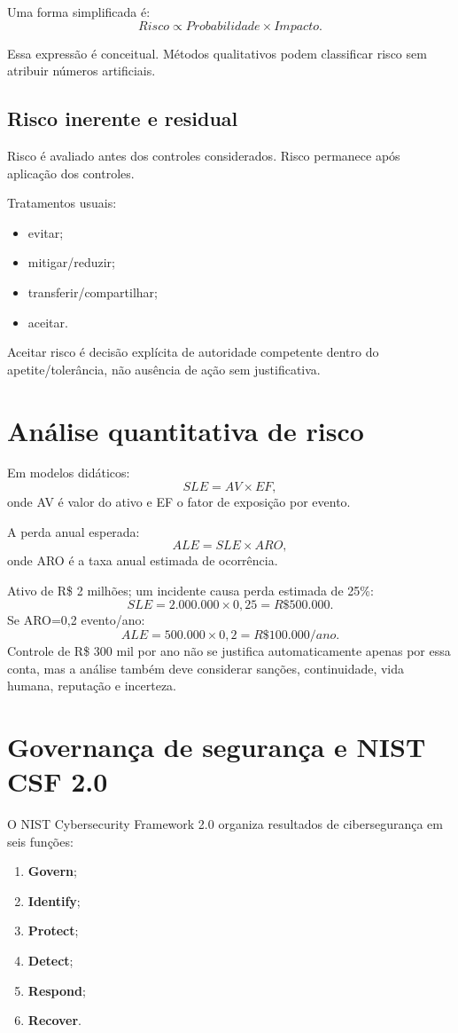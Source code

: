 Uma forma simplificada é:
\[
Risco \propto Probabilidade\times Impacto.
\]

Essa expressão é conceitual. Métodos qualitativos podem classificar risco sem atribuir números artificiais.

\subsection{Risco inerente e residual}

Risco  é avaliado antes dos controles considerados. Risco  permanece após aplicação dos controles.

Tratamentos usuais:
\begin{itemize}
\item evitar;
\item mitigar/reduzir;
\item transferir/compartilhar;
\item aceitar.
\end{itemize}

Aceitar risco é decisão explícita de autoridade competente dentro do apetite/tolerância, não ausência de ação sem justificativa.

\section{Análise quantitativa de risco}

Em modelos didáticos:
\[
SLE=AV\times EF,
\]
onde AV é valor do ativo e EF o fator de exposição por evento.

A perda anual esperada:
\[
ALE=SLE\times ARO,
\]
onde ARO é a taxa anual estimada de ocorrência.

\begin{exemplo}[ALE]
Ativo de R\$ 2 milhões; um incidente causa perda estimada de 25\%:
\[
SLE=2.000.000\times0{,}25=R\$500.000.
\]
Se ARO=0,2 evento/ano:
\[
ALE=500.000\times0{,}2=R\$100.000/ano.
\]
Controle de R\$ 300 mil por ano não se justifica automaticamente apenas por essa conta, mas a análise também deve considerar sanções, continuidade, vida humana, reputação e incerteza.
\end{exemplo}

\section{Governança de segurança e NIST CSF 2.0}

O NIST Cybersecurity Framework 2.0 organiza resultados de cibersegurança em seis funções:
\begin{enumerate}
\item \textbf{Govern};
\item \textbf{Identify};
\item \textbf{Protect};
\item \textbf{Detect};
\item \textbf{Respond};
\item \textbf{Recover}.
\end{enumerate}

